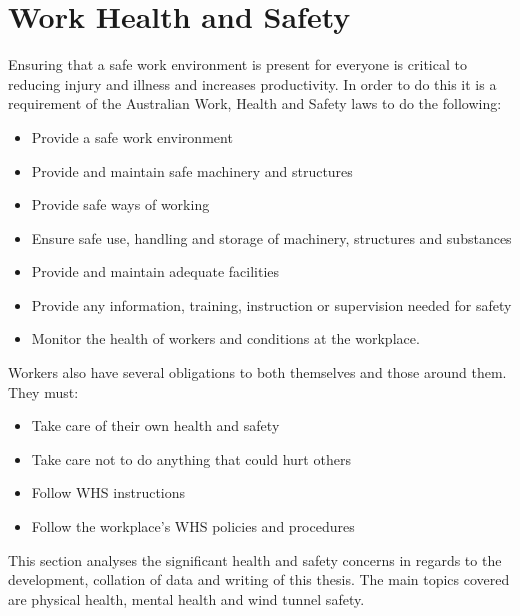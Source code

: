 \graphicspath{{./Appendix/Figs/}}

\cleardoublepage
\chapter{Work Health and Safety}
\label{app:whs}

Ensuring that a safe work environment is present for everyone is critical to reducing injury and illness and increases productivity. In order to do this it is a requirement of the Australian Work, Health and Safety laws to do the following\cite{}: 

\begin{itemize}
    \item Provide a safe work environment
    \item Provide and maintain safe machinery and structures
    \item Provide safe ways of working
    \item Ensure safe use, handling and storage of machinery, structures and substances
    \item Provide and maintain adequate facilities
    \item Provide any information, training, instruction or supervision needed for safety
    \item Monitor the health of workers and conditions at the workplace.
\end{itemize}

Workers also have several obligations to both themselves and those around them. They must\cite{}:

\begin{itemize}
    \item Take care of their own health and safety
    \item Take care not to do anything that could hurt others
    \item Follow WHS instructions
    \item Follow the workplace’s WHS policies and procedures
\end{itemize}

This section analyses the significant health and safety concerns in regards to the development, collation of data and writing of this thesis. The main topics covered are physical health, mental health and wind tunnel safety.




